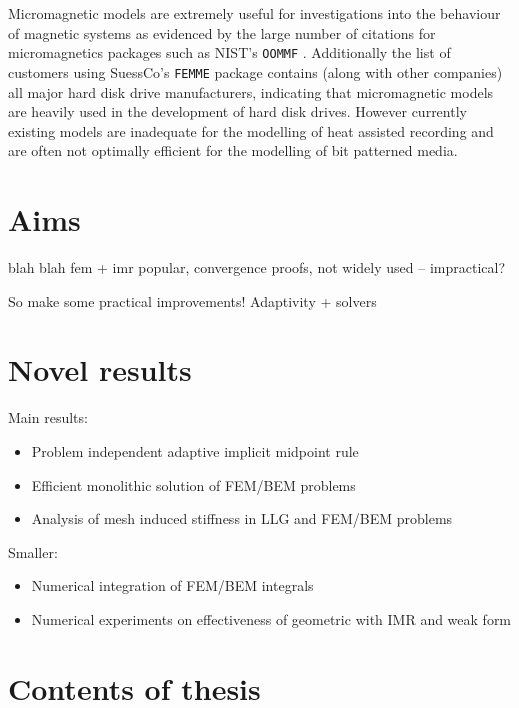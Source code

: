 Micromagnetic models are extremely useful for investigations into the behaviour of magnetic systems as evidenced by the large number of citations for micromagnetics packages such as NIST's \texttt{OOMMF} \cite{oommf-website}. Additionally the list of customers using SuessCo's \texttt{FEMME} package \cite{suessco-website} contains (along with other companies) all major hard disk drive manufacturers, indicating that micromagnetic models are heavily used in the development of hard disk drives. However currently existing models are inadequate for the modelling of heat assisted recording and are often not optimally efficient for the modelling of bit patterned media.



\section{Aims}

blah blah fem + imr popular, convergence proofs, not widely used -- impractical?


So make some practical improvements! Adaptivity + solvers


\section{Novel results}

Main results:
\begin{itemize}
\item Problem independent adaptive implicit midpoint rule
\item Efficient monolithic solution of FEM/BEM problems
\item Analysis of mesh induced stiffness in LLG and FEM/BEM problems
\end{itemize}

Smaller:
\begin{itemize}
\item Numerical integration of FEM/BEM integrals
\item Numerical experiments on effectiveness of geometric with IMR and weak form
\end{itemize}


\section{Contents of thesis}

